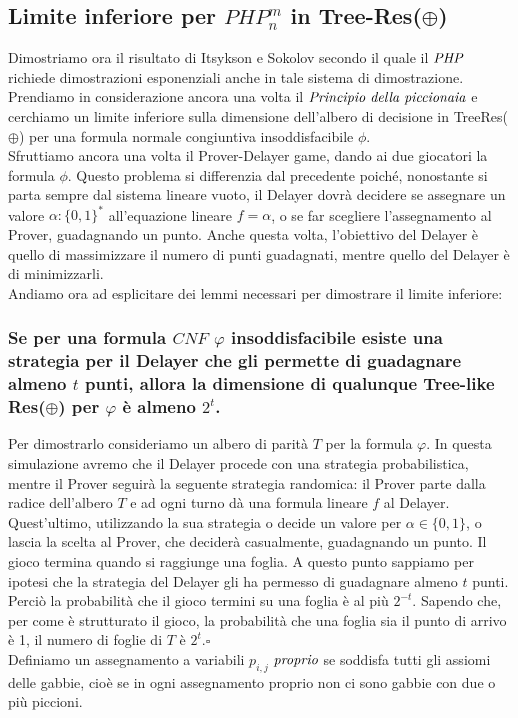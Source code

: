 \documentclass[it]{article}
\begin{document}
    \subsection{Limite inferiore per $PHP_{n}^{m}$ in Tree-Res($\oplus$)}
    Dimostriamo ora il risultato di Itsykson e Sokolov \cite{10.1007/978-3-662-44465-8_32} secondo il quale il $\emph{PHP}$ richiede dimostrazioni esponenziali anche in tale
    sistema di dimostrazione.
    Prendiamo in considerazione ancora una volta il $\emph{Principio della piccionaia}$ e cerchiamo un limite inferiore sulla dimensione dell'albero di decisione in TreeRes($\oplus$) per una formula normale congiuntiva insoddisfacibile $\phi$.\\
    Sfruttiamo ancora una volta il Prover-Delayer game, dando ai due giocatori la formula $\phi$. Questo problema si differenzia dal precedente poiché, nonostante si parta sempre dal sistema lineare vuoto, il Delayer dovrà decidere se assegnare un valore $\alpha : \{0,1\}^{*}$ all'equazione lineare $f=\alpha$, o se far scegliere l'assegnamento al Prover, guadagnando un punto. Anche questa volta, l'obiettivo del Delayer è quello di massimizzare il numero di punti guadagnati, mentre quello del Delayer è di minimizzarli.\\
    Andiamo ora ad esplicitare dei lemmi necessari per dimostrare il limite inferiore:
    \subsubsection{Se per una formula ${\displaystyle CNF}$ $\varphi$ insoddisfacibile esiste una strategia per il Delayer che gli permette di guadagnare almeno $\displaystyle t$ punti, allora la dimensione di qualunque Tree-like Res($\oplus$) per $\varphi$ è almeno $2^{t}$.}
    Per dimostrarlo consideriamo un albero di parità ${\displaystyle T}$ per la formula $\varphi$. In questa simulazione avremo che il Delayer procede con una strategia probabilistica, mentre il Prover seguirà la seguente strategia randomica: il Prover parte dalla radice dell'albero ${\displaystyle T}$ e ad ogni turno dà una formula lineare ${\displaystyle f}$ al Delayer. Quest'ultimo, utilizzando la sua strategia o decide un valore per $\alpha \in \{0,1\}$, o lascia la scelta al Prover, che deciderà casualmente, guadagnando un punto. Il gioco termina quando si raggiunge una foglia. A questo punto sappiamo per ipotesi che la strategia del Delayer gli ha permesso di guadagnare almeno ${\displaystyle t}$ punti. Perciò la probabilità che il gioco termini su una foglia è al più $2^{-t}$. Sapendo che, per come è strutturato il gioco, la probabilità che una foglia sia il punto di arrivo è 1, il numero di foglie di ${\displaystyle T}$ è $2^{t}$.$\square$\\
    Definiamo un assegnamento a variabili $p_{i,j}$ $\emph{proprio}$ se soddisfa tutti gli assiomi delle gabbie, cioè se in ogni assegnamento proprio non ci sono gabbie con due o più piccioni. 
\end{document}
